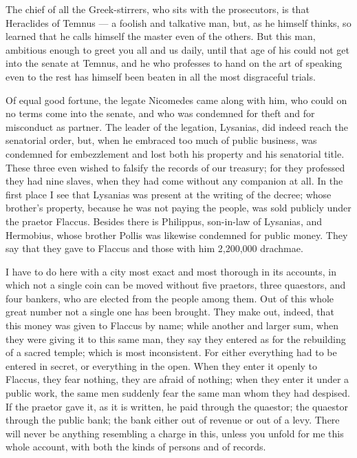  The chief of all the Greek-stirrers, who sits with the prosecutors, is that Heraclides of Temnus --- a foolish and talkative man, but, as he himself thinks, so learned that he calls himself the master even of the others. But this man, ambitious enough to greet you all and us daily, until that age of his could not get into the senate at Temnus, and he who professes to hand on the art of speaking even to the rest has himself been beaten in all the most disgraceful trials.

 Of equal good fortune, the legate Nicomedes came along with him, who could on no terms come into the senate, and who was condemned for theft and for misconduct as partner. The leader of the legation, Lysanias, did indeed reach the senatorial order, but, when he embraced too much of public business, was condemned for embezzlement and lost both his property and his senatorial title. These three even wished to falsify the records of our treasury; for they professed they had nine slaves, when they had come without any companion at all. In the first place I see that Lysanias was present at the writing of the decree; whose brother's property, because he was not paying the people, was sold publicly under the praetor Flaccus. Besides there is Philippus, son-in-law of Lysanias, and Hermobius, whose brother Pollis was likewise condemned for public money. They say that they gave to Flaccus and those with him 2,200,000 drachmae.

 I have to do here with a city most exact and most thorough in its accounts, in which not a single coin can be moved without five praetors, three quaestors, and four bankers, who are elected from the people among them. Out of this whole great number not a single one has been brought. They make out, indeed, that this money was given to Flaccus by name; while another and larger sum, when they were giving it to this same man, they say they entered as for the rebuilding of a sacred temple; which is most inconsistent. For either everything had to be entered in secret, or everything in the open. When they enter it openly to Flaccus, they fear nothing, they are afraid of nothing; when they enter it under a public work, the same men suddenly fear the same man whom they had despised. If the praetor gave it, as it is written, he paid through the quaestor; the quaestor through the public bank; the bank either out of revenue or out of a levy. There will never be anything resembling a charge in this, unless you unfold for me this whole account, with both the kinds of persons and of records.

